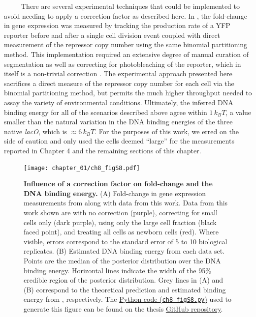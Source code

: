 \documentclass[12pt]{caltech_thesis}
\begin{document}
~~~~~There are several experimental techniques that could be implemented
to avoid needing to apply a correction factor as described here. In
\textcite{brewster2014}, the fold-change in gene expression was measured
by tracking the production rate of a YFP reporter before and after a
single cell division event coupled with direct measurement of the
repressor copy number using the same binomial partitioning method. This
implementation required an extensive degree of manual curation of
segmentation as well as correcting for photobleaching of the reporter,
which in itself is a non-trivial correction \autocite{garcia2011b}. The
experimental approach presented here sacrifices a direct measure of the
repressor copy number for each cell via the binomial partitioning
method, but permits the much higher throughput needed to assay the
variety of environmental conditions. Ultimately, the inferred DNA
binding energy for all of the scenarios described above agree within
\(1\, k_BT\), a value smaller than the natural variation in the DNA
binding energies of the three native \emph{lacO}, which is
\(\approx 6\, k_BT\). For the purposes of this work, we erred on the
side of caution and only used the cells deemed ``large'' for the
measurements reported in Chapter 4 and the remaining sections of this
chapter.

\hypertarget{fig:correction_factor}{%
\begin{figure}
\centering
\texttt{[image: chapter\_01/ch8\_figS8.pdf]}
\caption[{Influence of a correction factor on fold-change and the DNA
binding energy.}]{\textbf{Influence of a correction factor on
fold-change and the DNA binding energy.} (A) Fold-change in gene
expression measurements from
\autocite{brewster2014,garcia2011,razo-mejia2018} along with data from
this work. Data from this work shown are with no correction (purple),
correcting for small cells only (dark purple), using only the large cell
fraction (black faced point), and treating all cells as newborn cells
(red). Where visible, errors correspond to the standard error of 5 to 10
biological replicates. (B) Estimated DNA binding energy from each data
set. Points are the median of the posterior distribution over the DNA
binding energy. Horizontal lines indicate the width of the 95\% credible
region of the posterior distribution. Grey lines in (A) and (B)
correspond to the theoretical prediction and estimated binding energy
from \textcite{garcia2011}, respectively. The
\href{https://github.com/gchure/phd/blob/master/src/chapter_08/code/ch8_figS8.py}{Python
code (\texttt{ch8\_figS8.py})} used to generate this figure can be found
on the thesis \href{https://github.com/gchure/phd}{GitHub repository}.}
\label{fig:correction_factor}
\end{figure}
}
\end{document}
